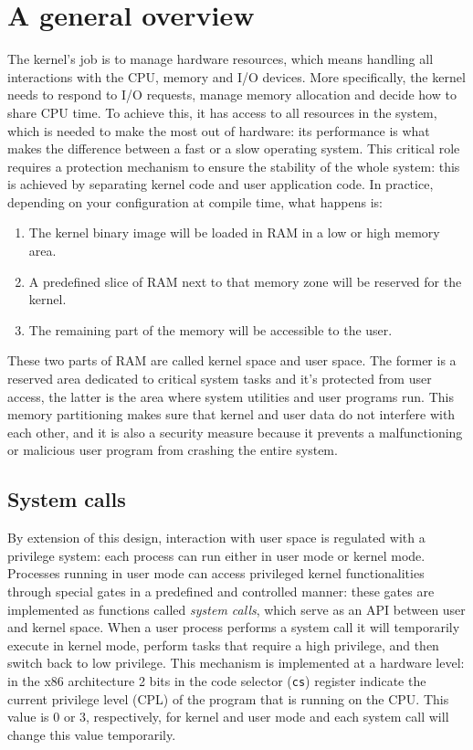 \documentclass[10pt]{book}
\begin{document}
\section{A general overview} 
\label{sec:general}
The kernel's job is to manage hardware resources, which means handling all interactions with the CPU, memory and I/O devices. More specifically, the kernel needs to respond to I/O requests, manage memory allocation and decide how to share CPU time. To achieve this, it has access to all resources in the system, which is needed to make the most out of hardware: its performance is what makes the difference between a fast or a slow operating system. This critical role requires a protection mechanism to ensure the stability of the whole system: this is achieved by separating kernel code and user application code. In practice, depending on your configuration at compile time, what happens is: 
\begin{enumerate}
    \item The kernel binary image will be loaded in RAM in a low or high memory area.
    \item A predefined slice of RAM next to that memory zone will be reserved for the kernel. 
    \item The remaining part of the memory will be accessible to the user.
\end{enumerate}
These two parts of RAM are called kernel space and user space. The former is a reserved area dedicated to critical system tasks and it's protected from user access, the latter is the area where system utilities and user programs run. This memory partitioning makes sure that kernel and user data do not interfere with each other, and it is also a security measure because it prevents a malfunctioning or malicious user program from crashing the entire system.

\subsection{System calls} By extension of this design, interaction with user space is regulated with a privilege system: each process can run either in user mode or kernel mode. Processes running in user mode can access privileged kernel functionalities through special gates in a predefined and controlled manner: these gates are implemented as functions called \textit{system calls}, which serve as an API between user and kernel space. When a user process performs a system call it will temporarily execute in kernel mode, perform tasks that require a high privilege, and then switch back to low privilege. This mechanism is implemented at a hardware level: in the x86 architecture 2 bits in the code selector (\verb|cs|) register indicate the current privilege level (CPL) of the program that is running on the CPU. This value is 0 or 3, respectively, for kernel and user mode and each system call will change this value temporarily. 
\end{document}
